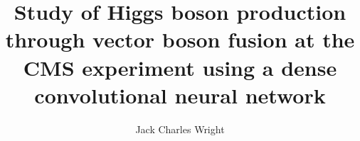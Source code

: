 \documentclass[hyperpdf,bindnopdf,10pt]{hepthesis}
\title{Study of Higgs boson production through vector boson fusion at the CMS experiment using a dense convolutional neural network}
\author{Jack Charles Wright}
\begin{document}
\begin{frontmatter}
    
\end{frontmatter}


\begin{mainmatter}

    \cleardoublepage

    

    

    

    

    

    

    

    

\end{mainmatter}


\appendix
\begin{appendices}
    
    
\end{appendices}


\begin{backmatter}
    
\end{backmatter}
\end{document}
